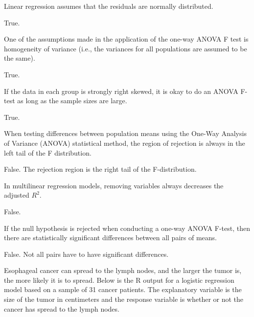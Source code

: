 \documentclass[11pt]{exam}
\begin{document}
\begin{questions}
\begin{parts}
\item Linear regression assumes that the residuals are normally distributed.  
\begin{solution}
True.
\end{solution}
\vfill

\item One of the assumptions made in the application of the one-way ANOVA F test is homogeneity of variance (i.e., the variances for all populations are assumed to be the same).
\begin{solution}
True.
\end{solution}
\vfill


\item If the data in each group is strongly right skewed, it is okay to do an ANOVA F-test as long as the sample sizes are large.  
\begin{solution}
True.
\end{solution}
\vfill


\item When testing differences between population means using the One-Way Analysis of Variance (ANOVA) statistical method, the region of rejection is always in the left tail of the F distribution. 
\begin{solution}
False. The rejection region is the right tail of the F-distribution.
\end{solution}
\vfill


\item In multilinear regression models, removing variables always decreases the adjusted $R^2$.
\begin{solution}
False.
\end{solution}

\vfill


\item If the null hypothesis is rejected when conducting a one-way ANOVA F-test, then there are statistically significant differences between all pairs of means.
\begin{solution}
False. Not all pairs have to have significant differences.
\end{solution}
\vfill
\end{parts}

\newpage

\question Esophageal cancer can spread to the lymph nodes, and the larger the tumor is, the more likely it is to spread.  Below is the R output for a logistic regression model based on a sample of 31 cancer patients. The explanatory variable is the size of the tumor in centimeters and the response variable is whether or not the cancer has spread to the lymph nodes.


\end{questions}
\end{document}
